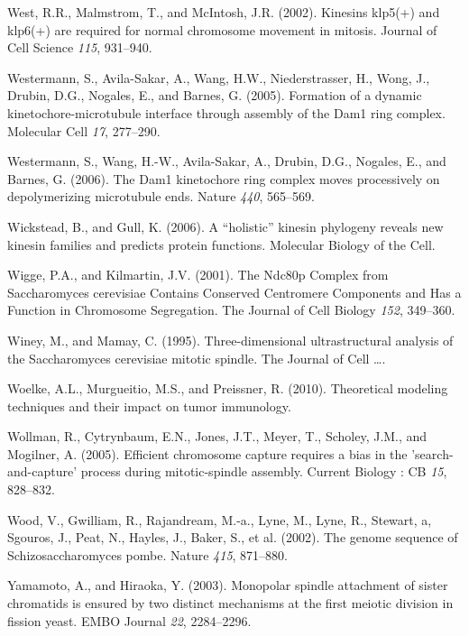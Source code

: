 \documentclass[12pt,a4paper,twoside,openright]{book}
\begin{document}
\hypertarget{ref-West2002}{}
West, R.R., Malmstrom, T., and McIntosh, J.R. (2002). Kinesins klp5(+)
and klp6(+) are required for normal chromosome movement in mitosis.
Journal of Cell Science \emph{115}, 931--940.

\hypertarget{ref-Westermann2005}{}
Westermann, S., Avila-Sakar, A., Wang, H.W., Niederstrasser, H., Wong,
J., Drubin, D.G., Nogales, E., and Barnes, G. (2005). Formation of a
dynamic kinetochore-microtubule interface through assembly of the Dam1
ring complex. Molecular Cell \emph{17}, 277--290.

\hypertarget{ref-Westermann2006}{}
Westermann, S., Wang, H.-W., Avila-Sakar, A., Drubin, D.G., Nogales, E.,
and Barnes, G. (2006). The Dam1 kinetochore ring complex moves
processively on depolymerizing microtubule ends. Nature \emph{440},
565--569.

\hypertarget{ref-Wickstead2006}{}
Wickstead, B., and Gull, K. (2006). A ``holistic'' kinesin phylogeny
reveals new kinesin families and predicts protein functions. Molecular
Biology of the Cell.

\hypertarget{ref-Wigge2001}{}
Wigge, P.A., and Kilmartin, J.V. (2001). The Ndc80p Complex from
Saccharomyces cerevisiae Contains Conserved Centromere Components and
Has a Function in Chromosome Segregation. The Journal of Cell Biology
\emph{152}, 349--360.

\hypertarget{ref-Winey1995}{}
Winey, M., and Mamay, C. (1995). Three-dimensional ultrastructural
analysis of the Saccharomyces cerevisiae mitotic spindle. The Journal of
Cell \ldots{}.

\hypertarget{ref-Woelke2010}{}
Woelke, A.L., Murgueitio, M.S., and Preissner, R. (2010). Theoretical
modeling techniques and their impact on tumor immunology.

\hypertarget{ref-Wollman2005}{}
Wollman, R., Cytrynbaum, E.N., Jones, J.T., Meyer, T., Scholey, J.M.,
and Mogilner, A. (2005). Efficient chromosome capture requires a bias in
the 'search-and-capture' process during mitotic-spindle assembly.
Current Biology : CB \emph{15}, 828--832.

\hypertarget{ref-Wood2002a}{}
Wood, V., Gwilliam, R., Rajandream, M.-a., Lyne, M., Lyne, R., Stewart,
a, Sgouros, J., Peat, N., Hayles, J., Baker, S., et al. (2002). The
genome sequence of Schizosaccharomyces pombe. Nature \emph{415},
871--880.

\hypertarget{ref-Yamamoto2003}{}
Yamamoto, A., and Hiraoka, Y. (2003). Monopolar spindle attachment of
sister chromatids is ensured by two distinct mechanisms at the first
meiotic division in fission yeast. EMBO Journal \emph{22}, 2284--2296.
\end{document}
